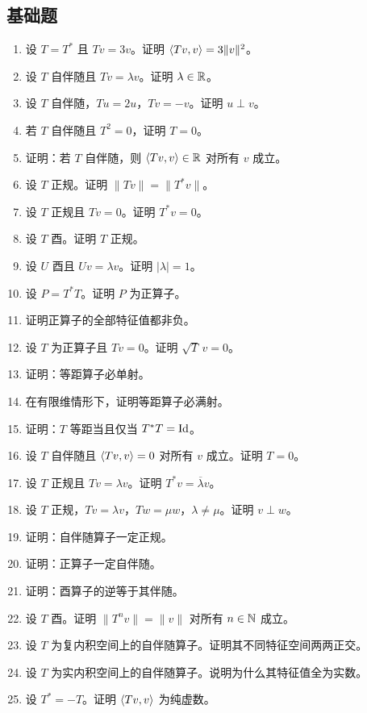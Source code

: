 \subsection*{基础题}
\begin{enumerate}[label=\textbf{\arabic*.}, leftmargin=*, itemsep=0.5em]
\item \basic 设 $T=T^*$ 且 $Tv=3v$。证明 $\langle Tv, v \rangle=3\|v\|^2$。
\item \basic 设 $T$ 自伴随且 $Tv=\lambda v$。证明 $\lambda\in\mathbb{R}$。
\item \basic 设 $T$ 自伴随，$Tu=2u$，$Tv=-v$。证明 $u\perp v$。
\item \basic 若 $T$ 自伴随且 $T^2=0$，证明 $T=0$。
\item \basic 证明：若 $T$ 自伴随，则 $\langle Tv, v \rangle\in\mathbb{R}$ 对所有 $v$ 成立。
\item \basic 设 $T$ 正规。证明 $\|Tv\|=\|T^*v\|$。
\item \basic 设 $T$ 正规且 $Tv=0$。证明 $T^*v=0$。
\item \basic 设 $T$ 酉。证明 $T$ 正规。
\item \basic 设 $U$ 酉且 $Uv=\lambda v$。证明 $|\lambda|=1$。
\item \basic 设 $P=T^*T$。证明 $P$ 为正算子。
\item \basic 证明正算子的全部特征值都非负。
\item \basic 设 $T$ 为正算子且 $Tv=0$。证明 $\sqrt{T}\,v=0$。
\item \basic 证明：等距算子必单射。
\item \basic 在有限维情形下，证明等距算子必满射。
\item \basic 证明：$T$ 等距当且仅当 $T^*T=\mathrm{Id}$。
\item \basic 设 $T$ 自伴随且 $\langle Tv, v \rangle=0$ 对所有 $v$ 成立。证明 $T=0$。
\item \basic 设 $T$ 正规且 $Tv=\lambda v$。证明 $T^*v=\overline{\lambda}v$。
\item \basic 设 $T$ 正规，$Tv=\lambda v$，$Tw=\mu w$，$\lambda\neq\mu$。证明 $v\perp w$。
\item \basic 证明：自伴随算子一定正规。
\item \basic 证明：正算子一定自伴随。
\item \basic 证明：酉算子的逆等于其伴随。
\item \basic 设 $T$ 酉。证明 $\|T^nv\|=\|v\|$ 对所有 $n\in\mathbb{N}$ 成立。
\item \basic 设 $T$ 为复内积空间上的自伴随算子。证明其不同特征空间两两正交。
\item \basic 设 $T$ 为实内积空间上的自伴随算子。说明为什么其特征值全为实数。
\item \basic 设 $T^*=-T$。证明 $\langle Tv, v \rangle$ 为纯虚数。
\end{enumerate}

